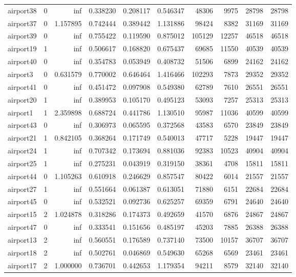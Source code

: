 \begin{longtable}{|l|r|r|r|r|r|r|r|r|r|}
airport38 & 0 & inf & 0.338230 & 0.208117 & 0.546347 & 48306 & 9975 & 28798 & 28798 \\
airport37 & 0 & 1.157895 & 0.742444 & 0.389442 & 1.131886 & 98424 & 8382 & 31169 & 31169 \\
airport39 & 0 & inf & 0.755422 & 0.119590 & 0.875012 & 105129 & 12257 & 46518 & 46518 \\
airport19 & 1 & inf & 0.506617 & 0.168820 & 0.675437 & 69685 & 11550 & 40539 & 40539 \\
airport40 & 0 & inf & 0.354783 & 0.053949 & 0.408732 & 51506 & 6899 & 24162 & 24162 \\
airport3 & 0 & 0.631579 & 0.770002 & 0.646464 & 1.416466 & 102293 & 7873 & 29352 & 29352 \\
airport41 & 0 & inf & 0.451472 & 0.097908 & 0.549380 & 62789 & 7610 & 26551 & 26551 \\
airport20 & 1 & inf & 0.389953 & 0.105170 & 0.495123 & 53093 & 7257 & 25313 & 25313 \\
airport1 & 1 & 2.359898 & 0.688724 & 0.441786 & 1.130510 & 95987 & 11036 & 40599 & 40599 \\
airport43 & 0 & inf & 0.306973 & 0.065595 & 0.372568 & 43583 & 6570 & 23849 & 23849 \\
airport21 & 1 & 0.842105 & 0.368264 & 0.171749 & 0.540013 & 47717 & 5228 & 19447 & 19447 \\
airport24 & 1 & inf & 0.707342 & 0.173694 & 0.881036 & 92383 & 10523 & 40904 & 40904 \\
airport25 & 1 & inf & 0.275231 & 0.043919 & 0.319150 & 38361 & 4708 & 15811 & 15811 \\
airport44 & 0 & 1.105263 & 0.610918 & 0.246629 & 0.857547 & 80422 & 6014 & 21557 & 21557 \\
airport27 & 1 & inf & 0.551664 & 0.061387 & 0.613051 & 71880 & 6151 & 22684 & 22684 \\
airport45 & 0 & inf & 0.532521 & 0.092736 & 0.625257 & 69359 & 6791 & 24640 & 24640 \\
airport15 & 2 & 1.024878 & 0.318286 & 0.174373 & 0.492659 & 41570 & 6876 & 24867 & 24867 \\
airport47 & 0 & inf & 0.333541 & 0.151656 & 0.485197 & 45203 & 7885 & 26388 & 26388 \\
airport13 & 2 & inf & 0.560551 & 0.176589 & 0.737140 & 73500 & 10157 & 36707 & 36707 \\
airport18 & 2 & inf & 0.502761 & 0.046869 & 0.549630 & 65268 & 6569 & 23461 & 23461 \\
airport17 & 2 & 1.000000 & 0.736701 & 0.442653 & 1.179354 & 94211 & 8579 & 32140 & 32140 \\

\end{longtable}
